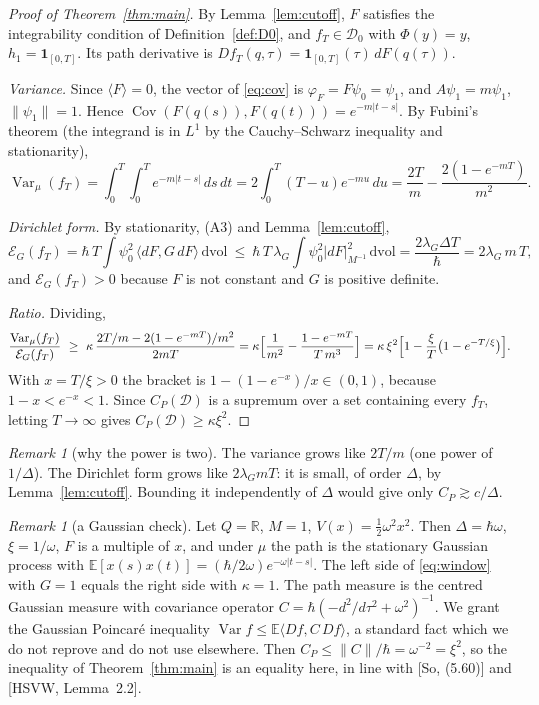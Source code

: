 \documentclass[11pt,a4paper]{article}
\theoremstyle{definition}
\theoremstyle{remark}
\newtheorem{remark}[theorem]{Remark}
\newcommand{\E}{\mathbb{E}}
\newcommand{\R}{\mathbb{R}}
\newcommand{\Var}{\operatorname{Var}}
\newcommand{\Cov}{\operatorname{Cov}}
\newcommand{\cE}{\mathcal{E}}
\newcommand{\cD}{\mathcal{D}}
\newcommand{\dvol}{\,\mathrm{dvol}}
\begin{document}
\begin{proof}[Proof of Theorem~\ref{thm:main}]
By Lemma~\ref{lem:cutoff}, $F$ satisfies the integrability condition of Definition~\ref{def:D0}, and $f_T\in\cD_0$ with $\Phi(y)=y$, $h_1=\mathbf 1_{[0,T]}$.
Its path derivative is $Df_T(q,\tau)=\mathbf 1_{[0,T]}(\tau)\,dF(q(\tau))$.

\emph{Variance.}
Since $\langle F\rangle=0$, the vector of \eqref{eq:cov} is $\varphi_F=F\psi_0=\psi_1$, and $A\psi_1=m\psi_1$, $\|\psi_1\|=1$.
Hence $\Cov(F(q(s)),F(q(t)))=e^{-m|t-s|}$.
By Fubini's theorem (the integrand is in $L^1$ by the Cauchy--Schwarz inequality and stationarity),
\[
  \Var_\mu(f_T)=\int_0^T\!\!\int_0^Te^{-m|t-s|}\,ds\,dt=2\int_0^T(T-u)e^{-mu}\,du=\frac{2T}{m}-\frac{2(1-e^{-mT})}{m^2}.
\]

\emph{Dirichlet form.}
By stationarity, (A3) and Lemma~\ref{lem:cutoff},
\[
  \cE_G(f_T)=\hbar\,T\int\psi_0^2\,\langle dF,G\,dF\rangle\dvol\ \le\ \hbar\,T\,\lambda_G\int\psi_0^2|dF|^2_{M^{-1}}\dvol=\frac{2\lambda_G\Delta T}{\hbar}=2\lambda_G\,m\,T ,
\]
and $\cE_G(f_T)>0$ because $F$ is not constant and $G$ is positive definite.

\emph{Ratio.}
Dividing,
\[
  \frac{\Var_\mu(f_T)}{\cE_G(f_T)}\ \ge\ \kappa\,\frac{2T/m-2(1-e^{-mT})/m^2}{2mT}=\kappa\Bigl[\frac1{m^2}-\frac{1-e^{-mT}}{T\,m^3}\Bigr]=\kappa\,\xi^2\Bigl[1-\frac{\xi}{T}\bigl(1-e^{-T/\xi}\bigr)\Bigr].
\]
With $x=T/\xi>0$ the bracket is $1-(1-e^{-x})/x\in(0,1)$, because $1-x<e^{-x}<1$.
Since $C_P(\cD)$ is a supremum over a set containing every $f_T$, letting $T\to\infty$ gives $C_P(\cD)\ge\kappa\xi^2$.
\end{proof}

\begin{remark}[why the power is two]\label{rem:power}
The variance grows like $2T/m$ (one power of $1/\Delta$). The Dirichlet form grows like $2\lambda_GmT$: it is small, of order $\Delta$, by Lemma~\ref{lem:cutoff}. Bounding it independently of $\Delta$ would give only $C_P\gtrsim c/\Delta$.
\end{remark}

\begin{remark}[a Gaussian check]\label{rem:gauss}
Let $Q=\R$, $M=1$, $V(x)=\tfrac12\omega^2x^2$. Then $\Delta=\hbar\omega$, $\xi=1/\omega$, $F$ is a multiple of $x$, and under $\mu$ the path is the stationary Gaussian process with $\E[x(s)x(t)]=(\hbar/2\omega)e^{-\omega|t-s|}$. The left side of \eqref{eq:window} with $G=1$ equals the right side with $\kappa=1$.
The path measure is the centred Gaussian measure with covariance operator $C=\hbar(-d^2/d\tau^2+\omega^2)^{-1}$.
We grant the Gaussian Poincar\'e inequality $\Var f\le\E\langle Df,C\,Df\rangle$, a standard fact which we do not reprove and do not use elsewhere.
Then $C_P\le\|C\|/\hbar=\omega^{-2}=\xi^2$, so the inequality of Theorem~\ref{thm:main} is an equality here, in line with [So, (5.60)] and [HSVW, Lemma~2.2].
\end{remark}
\end{document}
